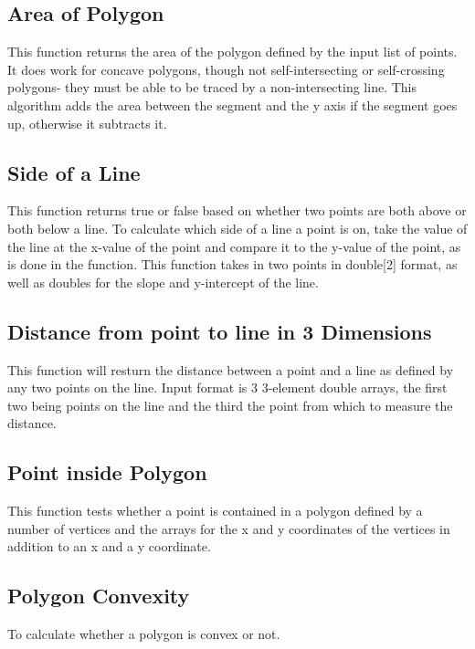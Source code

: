 \subsection{Area of Polygon}
This function returns the area of the polygon defined by the input list of points. It does work for concave polygons, though not self-intersecting or self-crossing polygons- they must be able to be traced by a non-intersecting line. This algorithm adds the area between the segment and the y axis if the segment goes up, otherwise it subtracts it.

\subsection{Side of a Line}
This function returns true or false based on whether two points are both above or both below a line. To calculate which side of a line a point is on, take the value of the line at the x-value of the point and compare it to the y-value of the point, as is done in the function. This function takes in two points in double[2] format, as well as doubles for the slope and y-intercept of the line.

\subsection{Distance from point to line in 3 Dimensions}
This function will resturn the distance between a point and a line as defined by any two points on the line. Input format is 3 3-element double arrays, the first two being points on the line and the third the point from which to measure the distance.

\subsection{Point inside Polygon}
This function tests whether a point is contained in a polygon defined by a number of vertices and the arrays for the x and y coordinates of the vertices in addition to an x and a y coordinate.

\subsection{Polygon Convexity}
To calculate whether a polygon is convex or not.
